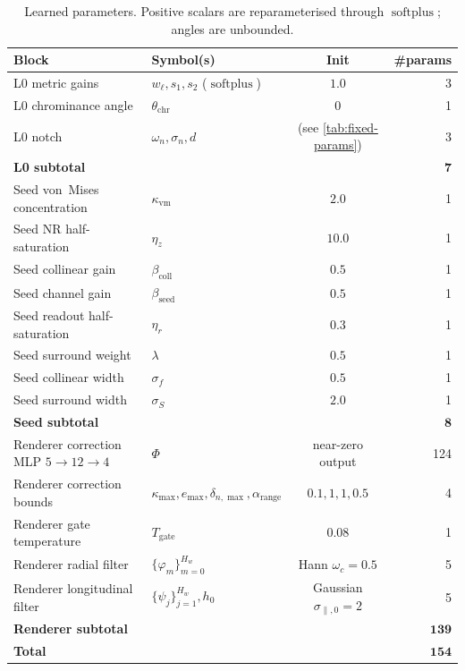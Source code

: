 \documentclass[11pt,a4paper]{article}
\newcommand{\softplus}{\operatorname{softplus}}
\begin{document}
\begin{table}[h]
\centering
\caption{Learned parameters. Positive scalars are reparameterised through $\softplus$; angles are unbounded.}
\label{tab:learned-params}
\renewcommand{\arraystretch}{1.15}
\begin{tabular}{llcr}
\toprule
Block & Symbol(s) & Init & \#params \\
\midrule
L0 metric gains & $w_\ell, s_1, s_2$ ($\softplus$) & $1.0$ & 3 \\
L0 chrominance angle & $\theta_{\mathrm{chr}}$ & $0$ & 1 \\
L0 notch & $\omega_n, \sigma_n, d$ & (see \cref{tab:fixed-params}) & 3 \\
\midrule
\multicolumn{3}{l}{\textbf{L0 subtotal}} & $\bm{7}$ \\
\midrule
Seed von~Mises concentration & $\kappa_{\mathrm{vm}}$ & $2.0$ & 1 \\
Seed NR half-saturation & $\eta_z$ & $10.0$ & 1 \\
Seed collinear gain & $\beta_{\mathrm{coll}}$ & $0.5$ & 1 \\
Seed channel gain & $\beta_{\mathrm{seed}}$ & $0.5$ & 1 \\
Seed readout half-saturation & $\eta_r$ & $0.3$ & 1 \\
Seed surround weight & $\lambda$ & $0.5$ & 1 \\
Seed collinear width & $\sigma_f$ & $0.5$ & 1 \\
Seed surround width & $\sigma_S$ & $2.0$ & 1 \\
\midrule
\multicolumn{3}{l}{\textbf{Seed subtotal}} & $\bm{8}$ \\
\midrule
Renderer correction MLP $5\to 12\to 4$ & $\Phi$ & near-zero output & 124 \\
Renderer correction bounds & $\kappa_{\max}, e_{\max}, \delta_{n,\max}, \alpha_{\mathrm{range}}$ & $0.1, 1, 1, 0.5$ & 4 \\
Renderer gate temperature & $T_{\mathrm{gate}}$ & $0.08$ & 1 \\
Renderer radial filter & $\{\varphi_m\}_{m=0}^{H_w}$ & Hann $\omega_c=0.5$ & 5 \\
Renderer longitudinal filter & $\{\psi_j\}_{j=1}^{H_w}, h_0$ & Gaussian $\sigma_{\parallel,0}=2$ & 5 \\
\midrule
\multicolumn{3}{l}{\textbf{Renderer subtotal}} & $\bm{139}$ \\
\midrule
\multicolumn{3}{l}{\textbf{Total}} & $\bm{154}$ \\
\bottomrule
\end{tabular}
\end{table}
\end{document}

